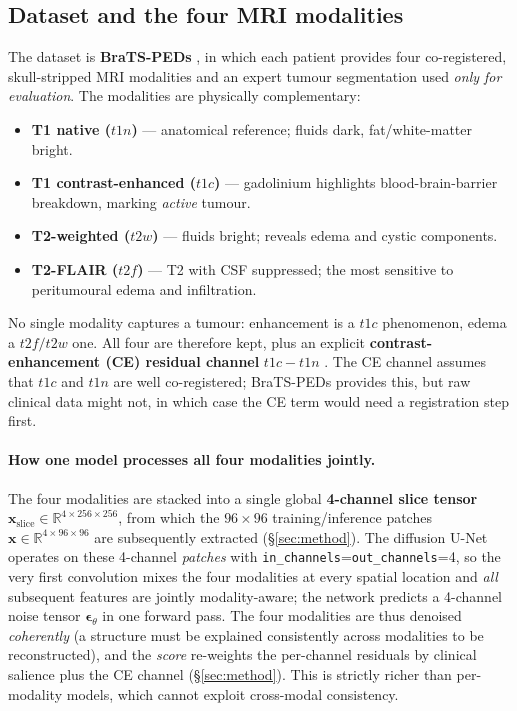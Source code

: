 \documentclass[12pt, a4paper]{article}
\theoremstyle{definition}\newtheorem{definition}{Definition}
\newcommand{\R}{\mathbb{R}}
\newcommand{\x}{\bm{x}}
\newcommand{\eps}{\bm{\epsilon}}
\begin{document}
\subsection{Dataset and the four MRI modalities}
The dataset is \textbf{BraTS-PEDs} \cite{kazerooni2024}, in which each patient provides
four co-registered, skull-stripped MRI modalities and an expert tumour segmentation used
\emph{only for evaluation}. The modalities are physically complementary:
\begin{itemize}[leftmargin=1.3em,itemsep=1pt]
\item \textbf{T1 native ($t1n$)} --- anatomical reference; fluids dark, fat/white-matter bright.
\item \textbf{T1 contrast-enhanced ($t1c$)} --- gadolinium highlights blood-brain-barrier
breakdown, marking \emph{active} tumour.
\item \textbf{T2-weighted ($t2w$)} --- fluids bright; reveals edema and cystic components.
\item \textbf{T2-FLAIR ($t2f$)} --- T2 with CSF suppressed; the most sensitive to
peritumoural edema and infiltration.
\end{itemize}
No single modality captures a tumour: enhancement is a $t1c$ phenomenon, edema a
$t2f/t2w$ one. All four are therefore kept, plus an explicit
\textbf{contrast-enhancement (CE) residual channel} $t1c-t1n$ \cite{menze2015}. The CE
channel assumes that $t1c$ and $t1n$ are well co-registered; BraTS-PEDs provides this,
but raw clinical data might not, in which case the CE term would need a registration
step first.

\paragraph{How one model processes all four modalities jointly.}
The four modalities are stacked into a single global \textbf{4-channel slice
tensor} $\x_{\text{slice}}\in\R^{4\times256\times256}$, from which the
$96{\times}96$ training/inference patches $\x\in\R^{4\times96\times96}$ are
subsequently extracted (\S\ref{sec:method}). The diffusion U-Net operates on these
4-channel \emph{patches} with \texttt{in\_channels}=\texttt{out\_channels}=4, so the
very first convolution mixes the four modalities at every spatial location and
\emph{all} subsequent features are jointly modality-aware; the network predicts a
4-channel noise tensor $\eps_\theta$ in one forward pass. The four modalities are thus denoised \emph{coherently} (a structure
must be explained consistently across modalities to be reconstructed), and the
\emph{score} re-weights the per-channel residuals by clinical salience plus the CE
channel (\S\ref{sec:method}). This is strictly richer than per-modality models,
which cannot exploit cross-modal consistency.
\end{document}
